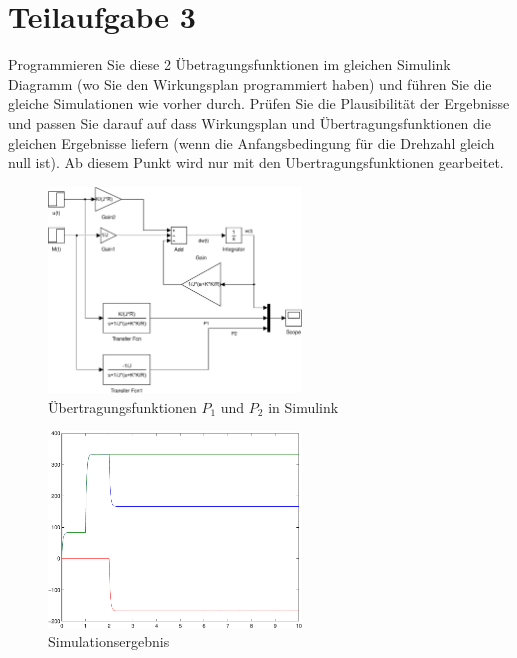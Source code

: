 \section{Teilaufgabe 3}
\begin{aufgabe}
    Programmieren Sie diese 2 Übetragungsfunktionen im gleichen Simulink 
    Diagramm (wo Sie den Wirkungsplan programmiert haben) und führen Sie die 
    gleiche Simulationen wie vorher durch. Prüfen Sie die Plausibilität der 
    Ergebnisse und passen Sie darauf auf dass Wirkungsplan und 
    Übertragungsfunktionen die gleichen Ergebnisse liefern (wenn die 
    Anfangsbedingung für die Drehzahl gleich null ist). Ab diesem Punkt wird 
    nur mit den Ubertragungsfunktionen gearbeitet.
\end{aufgabe}
\begin{figure}[h!]
    \centering
    \includegraphics[width=0.6\textwidth]{03/transfer.pdf}
    \caption{Übertragungsfunktionen $P_1$ und $P_2$ in Simulink}
    \label{fig:03}
\end{figure}
\begin{figure}[h!]
    \centering
    \includegraphics[width=0.6\textwidth]{03/transfer_plot.pdf}
    \caption{Simulationsergebnis}
    \label{fig:03plot}
\end{figure}
